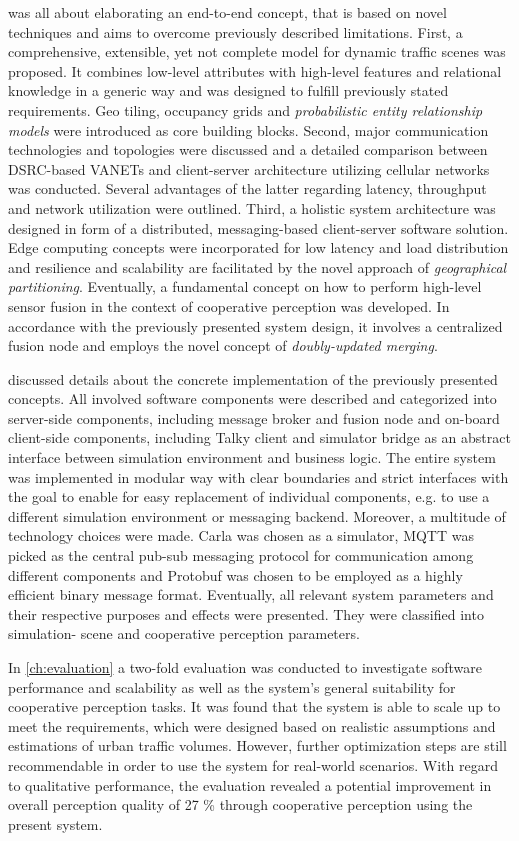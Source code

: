  was all about elaborating an end-to-end concept, that is based on novel techniques and aims to overcome previously described limitations. First, a comprehensive, extensible, yet not complete model for dynamic traffic scenes was proposed. It combines low-level attributes with high-level features and relational knowledge in a generic way and was designed to fulfill previously stated requirements. Geo tiling, occupancy grids and \textit{probabilistic entity relationship models} were introduced as core building blocks.
Second, major communication technologies and topologies were discussed and a detailed comparison between DSRC-based VANETs and client-server architecture utilizing cellular networks was conducted. Several advantages of the latter regarding latency, throughput and network utilization were outlined.
Third, a holistic system architecture was designed in form of a distributed, messaging-based client-server software solution. Edge computing concepts were incorporated for low latency and load distribution and resilience and scalability are facilitated by the novel approach of \textit{geographical partitioning}.
Eventually, a fundamental concept on how to perform high-level sensor fusion in the context of cooperative perception was developed. In accordance with the previously presented system design, it involves a centralized fusion node and employs the novel concept of \textit{doubly-updated merging}. 
\par
\bigskip

 discussed details about the concrete implementation of the previously presented concepts. All involved software components were described and categorized into server-side components, including message broker and fusion node and on-board client-side components, including Talky client and simulator bridge as an abstract interface between simulation environment and business logic. The entire system was implemented in modular way with clear boundaries and strict interfaces with the goal to enable for easy replacement of individual components, e.g. to use a different simulation environment or messaging backend. Moreover, a multitude of technology choices were made. Carla was chosen as a simulator, MQTT was picked as the central pub-sub messaging protocol for communication among different components and Protobuf was chosen to be employed as a highly efficient binary message format. Eventually, all relevant system parameters and their respective purposes and effects were presented. They were classified into simulation- scene and cooperative perception parameters. 
\par
\bigskip

In \cref{ch:evaluation} a two-fold evaluation was conducted to investigate software performance and scalability as well as the system's general suitability for cooperative perception tasks. It was found that the system is able to scale up to meet the requirements, which were designed based on realistic assumptions and estimations of urban traffic volumes. However, further optimization steps are still recommendable in order to use the system for real-world scenarios. With regard to qualitative performance, the evaluation revealed a potential improvement in overall perception quality of 27 \% through cooperative perception using the present system. 